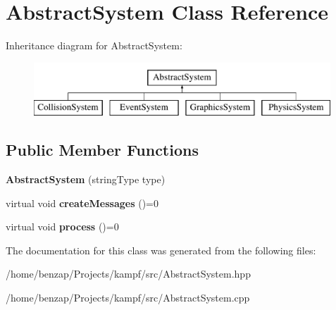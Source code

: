 \hypertarget{classAbstractSystem}{\section{Abstract\-System Class Reference}
\label{classAbstractSystem}
}
Inheritance diagram for Abstract\-System\-:\begin{figure}[H]
\begin{center}
\leavevmode
\includegraphics[height=2.000000cm]{classAbstractSystem}
\end{center}
\end{figure}
\subsection*{Public Member Functions}
\begin{DoxyCompactItemize}
\item 
\hypertarget{classAbstractSystem_ae5620bdb8f95185e236502976bc81ec9}{{\bfseries Abstract\-System} (string\-Type type)}\label{classAbstractSystem_ae5620bdb8f95185e236502976bc81ec9}

\item 
\hypertarget{classAbstractSystem_ab1bba043ff59ab1908ad0335e3d7b4eb}{virtual void {\bfseries create\-Messages} ()=0}\label{classAbstractSystem_ab1bba043ff59ab1908ad0335e3d7b4eb}

\item 
\hypertarget{classAbstractSystem_af8edcaa43ae3386786430864a68e86f5}{virtual void {\bfseries process} ()=0}\label{classAbstractSystem_af8edcaa43ae3386786430864a68e86f5}

\end{DoxyCompactItemize}


The documentation for this class was generated from the following files\-:\begin{DoxyCompactItemize}
\item 
/home/benzap/\-Projects/kampf/src/Abstract\-System.\-hpp\item 
/home/benzap/\-Projects/kampf/src/Abstract\-System.\-cpp\end{DoxyCompactItemize}
